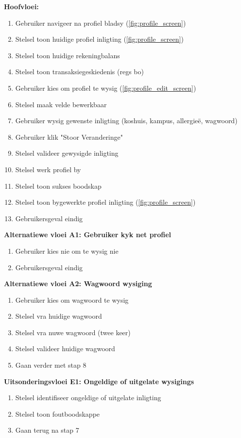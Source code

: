 \textbf{Hoofvloei:}
\begin{enumerate}
    \item Gebruiker navigeer na profiel bladsy (\autoref{fig:profile_screen})
    \item Stelsel toon huidige profiel inligting (\autoref{fig:profile_screen})
    \item Stelsel toon huidige rekeningbalans
    \item Stelsel toon transaksiegeskiedenis (regs bo)
    \item Gebruiker kies om profiel te wysig (\autoref{fig:profile_edit_screen})
    \item Stelsel maak velde bewerkbaar
    \item Gebruiker wysig gewenste inligting (koshuis, kampus, allergieë, wagwoord)
    \item Gebruiker klik "Stoor Veranderinge"
    \item Stelsel valideer gewysigde inligting
    \item Stelsel werk profiel by
    \item Stelsel toon sukses boodskap
    \item Stelsel toon bygewerkte profiel inligting (\autoref{fig:profile_screen})
    \item Gebruikersgeval eindig
\end{enumerate}

\textbf{Alternatiewe vloei A1: Gebruiker kyk net profiel}
\begin{enumerate}
    \item[5a.] Gebruiker kies nie om te wysig nie
    \item Gebruikersgeval eindig
\end{enumerate}

\textbf{Alternatiewe vloei A2: Wagwoord wysiging}
\begin{enumerate}
    \item[7a.] Gebruiker kies om wagwoord te wysig
    \item Stelsel vra huidige wagwoord
    \item Stelsel vra nuwe wagwoord (twee keer)
    \item Stelsel valideer huidige wagwoord
    \item Gaan verder met stap 8
\end{enumerate}

\textbf{Uitsonderingsvloei E1: Ongeldige of uitgelate wysigings}
\begin{enumerate}
    \item[9a.] Stelsel identifiseer ongeldige of uitgelate inligting
    \item Stelsel toon foutboodskappe
    \item Gaan terug na stap 7
\end{enumerate}

